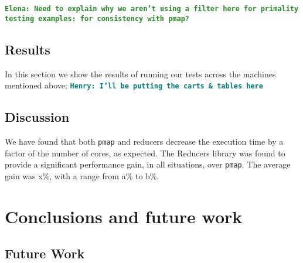\documentclass[12pt]{article}
\newcommand{\comment}[1]{{\bf \tt  {#1}}}
\newcommand{\emcomment}[1]{\textcolor{ForestGreen}{\comment{Elena: {#1}}}}
\newcommand{\hfcomment}[1]{\textcolor{Teal}{\comment{Henry: {#1}}}}
\newcommand{\clocode}[1]{{\texttt {#1}}}
\begin{document}
\emcomment{Need to explain why we aren't using a filter here for primality testing examples: for consistency with pmap?}

\subsection{Results}\label{sec:results}
In this section we show the results of running our tests across the machines mentioned above;
\hfcomment{I'll be putting the carts \& tables here}


\subsection{Discussion}\label{sec:discussion}
We have found that both \clocode{pmap} and reducers decrease the execution time by a factor of the number of cores, as expected. The Reducers library was found to provide a significant performance gain, in all situations, over \clocode{pmap}. The average gain was x\%, with a range from a\% to b\%.




\section{Conclusions and future work}\label{sec:conclusion}




\subsection{Future Work}\label{sec:future}








%
%




%  
%
%










\end{document}
